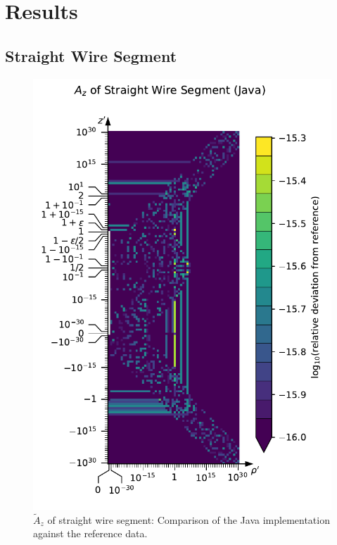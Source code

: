 \section{Results}
\label{sec:results}

\subsection{Straight Wire Segment}
\begin{figure}[htbp]
 \centering
 \includegraphics[height=\textwidth]{img/StraightWireSegment_A_z_Java.pdf}
 \caption{$\tilde{A}_z$ of straight wire segment: Comparison of the Java implementation against the reference data.}
 \label{fig:StraightWireSegment_A_z_Java}
\end{figure}
